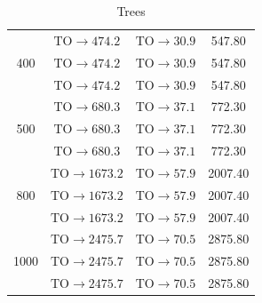 \begin{table}[h]
\begin{tabular}{c|c|c|c}
            \cmidrule(lr){1-4}

            \multirow{3}{*}{400}
                & $\mathrm{TO} \rightarrow 474.2$ & $\mathrm{TO} \rightarrow 30.9$ & 547.80 \\
                & $\mathrm{TO} \rightarrow 474.2$ & $\mathrm{TO} \rightarrow 30.9$ & 547.80 \\
                & $\mathrm{TO} \rightarrow 474.2$ & $\mathrm{TO} \rightarrow 30.9$ & 547.80 \\

            \cmidrule(lr){1-4}

            \multirow{3}{*}{500}
                & $\mathrm{TO} \rightarrow 680.3$ & $\mathrm{TO} \rightarrow 37.1$ & 772.30 \\
                & $\mathrm{TO} \rightarrow 680.3$ & $\mathrm{TO} \rightarrow 37.1$ & 772.30 \\
                & $\mathrm{TO} \rightarrow 680.3$ & $\mathrm{TO} \rightarrow 37.1$ & 772.30 \\

            \cmidrule(lr){1-4}

            \multirow{3}{*}{800}
                & $\mathrm{TO} \rightarrow 1673.2$ & $\mathrm{TO} \rightarrow 57.9$ & 2007.40 \\
                & $\mathrm{TO} \rightarrow 1673.2$ & $\mathrm{TO} \rightarrow 57.9$ & 2007.40 \\
                & $\mathrm{TO} \rightarrow 1673.2$ & $\mathrm{TO} \rightarrow 57.9$ & 2007.40 \\

            \cmidrule(lr){1-4}

            \multirow{3}{*}{1000}
                & $\mathrm{TO} \rightarrow 2475.7$ & $\mathrm{TO} \rightarrow 70.5$ & 2875.80 \\
                & $\mathrm{TO} \rightarrow 2475.7$ & $\mathrm{TO} \rightarrow 70.5$ & 2875.80 \\
                & $\mathrm{TO} \rightarrow 2475.7$ & $\mathrm{TO} \rightarrow 70.5$ & 2875.80 \\

            \bottomrule
        \end{tabular}
        \caption*{Trees}\end{table}


